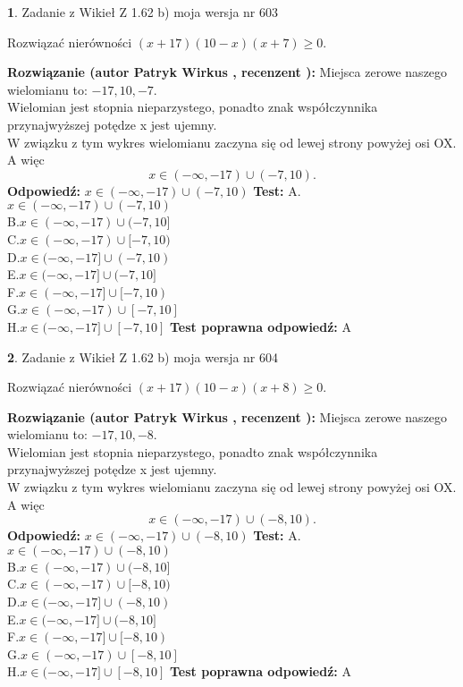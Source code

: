 \documentclass[12pt, a4paper]{article}
\theoremstyle{definition} %
\newtheorem{zad}{}
\newcommand{\zadStart}[1]{\begin{zad}#1\newline}
\newcommand{\zadStop}{\end{zad}}
\newcommand{\rozwStart}[2]{\noindent \textbf{Rozwiązanie (autor #1 , recenzent #2): }\newline}
\newcommand{\rozwStop}{\newline}
\newcommand{\odpStart}{\noindent \textbf{Odpowiedź:}\newline}
\newcommand{\odpStop}{\newline}
\newcommand{\testStart}{\noindent \textbf{Test:}\newline}
\newcommand{\testStop}{\newline}
\newcommand{\kluczStart}{\noindent \textbf{Test poprawna odpowiedź:}\newline}
\newcommand{\kluczStop}{\newline}
\begin{document}
\zadStart{Zadanie z Wikieł Z 1.62 b) moja wersja nr 603}

Rozwiązać nierówności $(x+17)(10-x)(x+7)\ge0$.
\zadStop
\rozwStart{Patryk Wirkus}{}
Miejsca zerowe naszego wielomianu to: $-17, 10, -7$.\\
Wielomian jest stopnia nieparzystego, ponadto znak współczynnika przy\linebreak najwyższej potędze x jest ujemny.\\ W związku z tym wykres wielomianu zaczyna się od lewej strony powyżej osi OX. A więc $$x \in (-\infty,-17) \cup (-7,10).$$
\rozwStop
\odpStart
$x \in (-\infty,-17) \cup (-7,10)$
\odpStop
\testStart
A.$x \in (-\infty,-17) \cup (-7,10)$\\
B.$x \in (-\infty,-17) \cup (-7,10]$\\
C.$x \in (-\infty,-17) \cup [-7,10)$\\
D.$x \in (-\infty,-17] \cup (-7,10)$\\
E.$x \in (-\infty,-17] \cup (-7,10]$\\
F.$x \in (-\infty,-17] \cup [-7,10)$\\
G.$x \in (-\infty,-17) \cup [-7,10]$\\
H.$x \in (-\infty,-17] \cup [-7,10]$
\testStop
\kluczStart
A
\kluczStop



\zadStart{Zadanie z Wikieł Z 1.62 b) moja wersja nr 604}

Rozwiązać nierówności $(x+17)(10-x)(x+8)\ge0$.
\zadStop
\rozwStart{Patryk Wirkus}{}
Miejsca zerowe naszego wielomianu to: $-17, 10, -8$.\\
Wielomian jest stopnia nieparzystego, ponadto znak współczynnika przy\linebreak najwyższej potędze x jest ujemny.\\ W związku z tym wykres wielomianu zaczyna się od lewej strony powyżej osi OX. A więc $$x \in (-\infty,-17) \cup (-8,10).$$
\rozwStop
\odpStart
$x \in (-\infty,-17) \cup (-8,10)$
\odpStop
\testStart
A.$x \in (-\infty,-17) \cup (-8,10)$\\
B.$x \in (-\infty,-17) \cup (-8,10]$\\
C.$x \in (-\infty,-17) \cup [-8,10)$\\
D.$x \in (-\infty,-17] \cup (-8,10)$\\
E.$x \in (-\infty,-17] \cup (-8,10]$\\
F.$x \in (-\infty,-17] \cup [-8,10)$\\
G.$x \in (-\infty,-17) \cup [-8,10]$\\
H.$x \in (-\infty,-17] \cup [-8,10]$
\testStop
\kluczStart
A
\kluczStop
\end{document}
